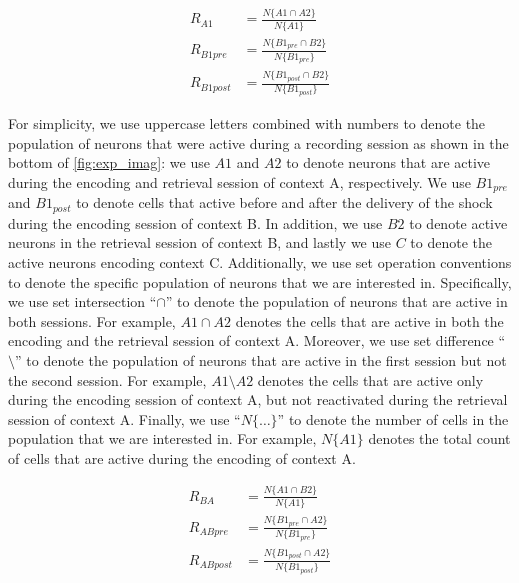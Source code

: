 \documentclass[master.tex]{subfiles}
\begin{document}
\begin{figure}
  \vspace{-15pt}
  \begin{align} \label{eq_react}
    R_{A1} & = \frac{N\{A1 \cap A2\}}{N\{A1\}} \nonumber \\
    R_{B1pre} & = \frac{N\{B1_{pre} \cap B2\}}{N\{B1_{pre}\}} \nonumber \\
    R_{B1post} & = \frac{N\{B1_{post} \cap B2\}}{N\{B1_{post}\}}
  \end{align}
  \vspace{-15pt}
\end{figure}

For simplicity, we use uppercase letters combined with numbers to denote the
population of neurons that were active during a recording session as shown in
the bottom of \autoref{fig:exp_imag}: we use $A1$ and $A2$ to denote neurons
that are active during the encoding and retrieval session of context A,
respectively. We use $B1_{pre}$ and $B1_{post}$ to denote cells that active
before and after the delivery of the shock during the encoding session of
context B. In addition, we use $B2$ to denote active neurons in the retrieval
session of context B, and lastly we use $C$ to denote the active neurons
encoding context C. Additionally, we use set operation conventions to denote the
specific population of neurons that we are interested in. Specifically, we use
set intersection ``$\cap$'' to denote the population of neurons that are active
in both sessions. For example, $A1 \cap A2$ denotes the cells that are active in
both the encoding and the retrieval session of context A. Moreover, we use set
difference ``$\setminus$'' to denote the population of neurons that are active
in the first session but not the second session. For example, $A1 \setminus A2$
denotes the cells that are active only during the encoding session of context A,
but not reactivated during the retrieval session of context A. Finally, we use
``$N\{\ldots\}$'' to denote the number of cells in the population that we are
interested in. For example, $N\{A1\}$ denotes the total count of cells that are
active during the encoding of context A.

\begin{figure}
  \vspace{-15pt}
  \begin{align} \label{eq_drift}
    R_{BA} & = \frac{N\{A1 \cap B2\}}{N\{A1\}} \nonumber \\
    R_{ABpre} & = \frac{N\{B1_{pre} \cap A2\}}{N\{B1_{pre}\}} \nonumber \\
    R_{ABpost} & = \frac{N\{B1_{post} \cap A2\}}{N\{B1_{post}\}}
  \end{align}
  \vspace{-15pt}
\end{figure}
\end{document}
